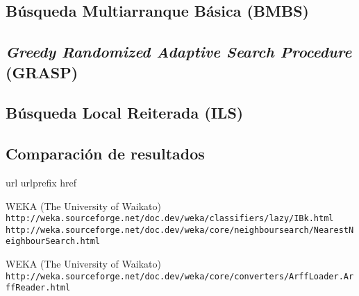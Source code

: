\documentclass[a4paper, 11pt]{article}
\begin{document}
		\subsection{Búsqueda Multiarranque Básica (\textbf{BMBS})}
			
			
			
		\subsection{\textit{Greedy Randomized Adaptive Search Procedure} (\textbf{GRASP})}
			
			
			
		\subsection{Búsqueda Local Reiterada (\textbf{ILS})}
			
			
			
			
		\subsection{Comparación de resultados}
	
	
	\newpage
	
	\begin{thebibliography}{10}
	\expandafter\ifx\csname url\endcsname\relax
	  \def\url#1{\texttt{#1}}\fi
	\expandafter\ifx\csname urlprefix\endcsname\relax\def\urlprefix{URL }\fi
	\expandafter\ifx\csname href\endcsname\relax
	  \def\href#1#2{#2} \def\path#1{#1}\fi
	
	WEKA (The University of Waikato)\\
	  \url{http://weka.sourceforge.net/doc.dev/weka/classifiers/lazy/IBk.html}\\
	  \url{http://weka.sourceforge.net/doc.dev/weka/core/neighboursearch/NearestNeighbourSearch.html}
	  
  	WEKA (The University of Waikato)\\
	  \url{http://weka.sourceforge.net/doc.dev/weka/core/converters/ArffLoader.ArffReader.html}
	  
	\end{thebibliography}
\end{document}
